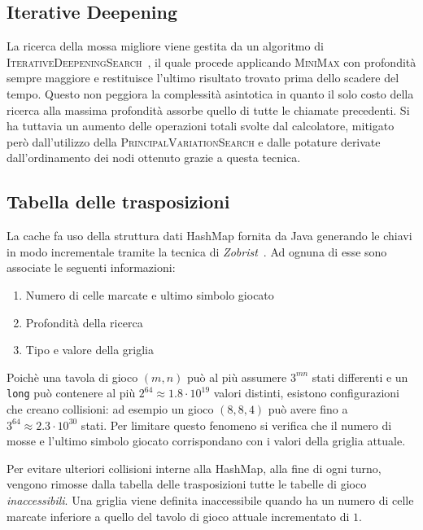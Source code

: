 \documentclass{article}
\begin{document}
\subsection{Iterative Deepening}

La ricerca della mossa migliore viene gestita da un algoritmo di
\textsc{IterativeDeepeningSearch}~\cite{id}, il quale procede applicando \textsc{MiniMax} 
con profondit\`a sempre maggiore e restituisce l'ultimo risultato trovato prima dello
scadere del tempo. \label{cost:id} Questo non peggiora la complessit\`a asintotica in quanto il
solo costo della ricerca alla massima profondit\`a assorbe quello di tutte
le chiamate precedenti. Si ha tuttavia un aumento delle operazioni totali svolte
dal calcolatore, mitigato per\`o dall'utilizzo della \textsc{PrincipalVariationSearch} 
e dalle potature derivate dall'ordinamento dei nodi ottenuto grazie a questa tecnica.

\subsection{Tabella delle trasposizioni}

La cache fa uso della struttura dati HashMap fornita da Java generando le chiavi 
in modo incrementale tramite la tecnica di \emph{Zobrist}~\cite{zobrist}. 
Ad ognuna di esse sono associate le seguenti informazioni:
\begin{enumerate}
  \item Numero di celle marcate e ultimo simbolo giocato
  \item Profondit\`a della ricerca
  \item Tipo e valore della griglia
\end{enumerate}
Poich\`e una tavola di gioco $(m,n)$ pu\`o al pi\`u assumere $3^{mn}$ stati differenti e
un \verb!long! pu\`o contenere al pi\`u $2^{64} \approx 1.8 \cdot 10^{19}$ valori distinti,
esistono configurazioni che creano collisioni: ad esempio un gioco $(8, 8, 4)$
pu\`o avere fino a $3^{64} \approx 2.3 \cdot 10^{30}$ stati. Per limitare questo
fenomeno si verifica che il numero di mosse e l'ultimo simbolo giocato
corrispondano con i valori della griglia attuale.

Per evitare ulteriori collisioni interne alla HashMap, alla fine di ogni turno,
vengono rimosse dalla tabella delle trasposizioni tutte le tabelle di gioco
\emph{inaccessibili}. Una griglia viene definita inaccessibile quando ha un numero di
celle marcate inferiore a quello del tavolo di gioco attuale incrementato di $1$.
\end{document}
